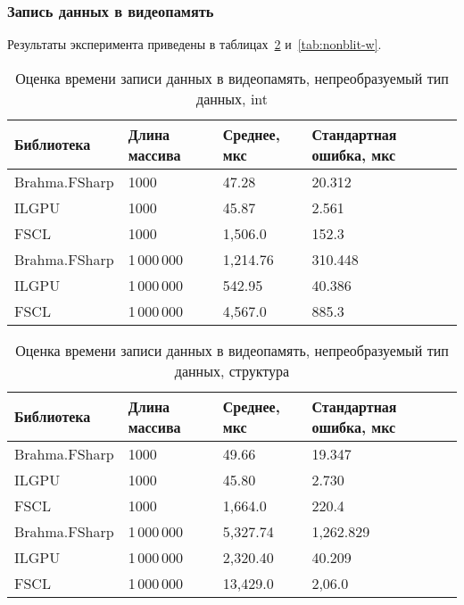 \subsubsection{Запись данных в видеопамять}
Результаты эксперимента приведены в таблицах~\ref{tab:blit-w} и~\ref{tab:nonblit-w}.

\begin{table}
    \begin{tabularx}{\textwidth}{|l|l|X|X|}
      \hline
      \textbf{Библиотека} & \textbf{Длина массива} & \textbf{Среднее, мкс} & \textbf{Стандартная ошибка, мкс} \\
      \hline
      Brahma.FSharp & 1000 & 47.28  & 20.312  \\
      ILGPU & 1000 & 45.87   & 2.561   \\
      FSCL & 1000 & 1,506.0  & 152.3   \\
      \hline
      Brahma.FSharp & 1\,000\,000 & 1,214.76  & 310.448  \\
      ILGPU & 1\,000\,000 & 542.95   & 40.386  \\
      FSCL & 1\,000\,000 & 4,567.0  & 885.3   \\
      \hline
    \end{tabularx}
  \caption{Оценка времени записи данных в видеопамять, непреобразуемый тип данных, int}
  \label{tab:blit-w}
\end{table}

\begin{table}
    \begin{tabularx}{\textwidth}{|l|l|X|X|}
      \hline
      \textbf{Библиотека} & \textbf{Длина массива} & \textbf{Среднее, мкс} & \textbf{Стандартная ошибка, мкс} \\
      \hline
      Brahma.FSharp & 1000 & 49.66  & 19.347  \\
      ILGPU & 1000 & 45.80   & 2.730   \\
      FSCL & 1000 & 1,664.0 & 220.4\\
      \hline
      Brahma.FSharp & 1\,000\,000 & 5,327.74  & 1,262.829 \\
      ILGPU & 1\,000\,000 & 2,320.40   & 40.209   \\
      FSCL & 1\,000\,000 & 13,429.0  & 2,06.0   \\
      \hline
    \end{tabularx}
  \caption{Оценка времени записи данных в видеопамять, непреобразуемый тип данных, структура}
  \label{tab:blit-w}
\end{table}

